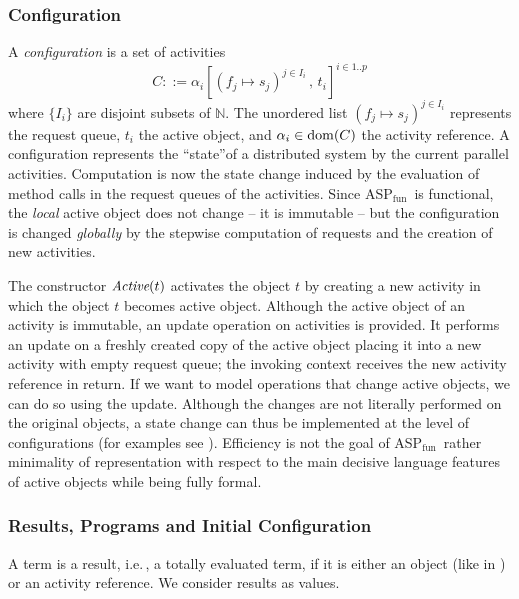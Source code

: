 \documentclass[10pt, conference, compsocconf]{IEEEtran}
\newcommand\aspfun{ASP${}_\text{fun}$\ }
\newcommand{\symb}[1]{\makebox{\it #1}}
\newcommand\dom{{\rm dom}}
\newcommand{\setN}{{\mathord{\mathbb N}}}
\newcommand\ie{i.e.\!\,, }
\begin{document}
{\subsubsection{Configuration}
A {\it configuration} is a set of activities
\[
C::=\alpha_i[(f_{j}\mapsto s_{j})^{j\in I_i}\,,\,t_i]^{i\in1..p} \]
where $\{I_i\}$ are disjoint subsets of  $\setN$. 
The unordered list $(f_{j}\mapsto s_{j})^{j\in I_i}$ represents the request queue, $t_i$
the active object, and $\alpha_i \in \dom(C)$ the activity reference.
A configuration represents the ``state''of a distributed system by the current parallel activities. 
Computation is now the state change induced by the evaluation of method calls in the request queues
of the activities.
Since \aspfun is functional, the {\it local} active object does not change -- it is immutable -- but the configuration is changed {\it globally}
by the stepwise computation of requests and the creation of new activities.

The constructor $\symb{Active}(t)$ activates the object $t$ by creating a new activity 
in which the object $t$ becomes active object. Although the active object of an activity is immutable, an update operation on
activities is provided. It performs an update on a freshly created copy
of the active object placing it into a new activity with empty request queue; 
the invoking context receives the new activity reference
in return. If we want to model operations that change active objects, we can do so using the
update. Although the changes are not literally performed on the original objects, a state change
can thus be implemented at the level of configurations (for examples see \cite{hkl:11}). 
Efficiency is not the goal of \aspfun rather 
minimality of representation with respect to the main decisive language features of 
active objects while being fully formal.




\subsubsection{Results, Programs and Initial Configuration}
A term is a result, \ie a totally evaluated term, if it is either an
object (like in \cite{AC96a}) or an activity reference. 
We consider results as values.

}
\end{document}
